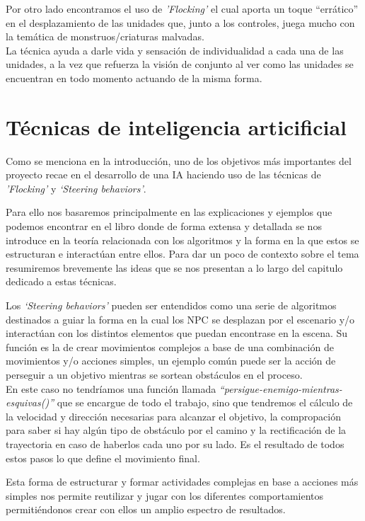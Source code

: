 Por otro lado encontramos el uso de \textit{'Flocking'} el cual aporta un toque ``errático''
en el desplazamiento de las unidades que, junto a los controles, juega mucho con la temática 
de monstruos/criaturas malvadas. \\
La técnica ayuda a darle vida y sensación de individualidad
a cada una de las unidades, a la vez que refuerza la visión de conjunto al ver como las
unidades se encuentran en todo momento actuando de la misma forma. 


\section{Técnicas de inteligencia articificial}
Como se menciona en la introducción, uno de los objetivos más importantes 
del proyecto recae en el desarrollo de una \ac{IA} haciendo uso de las técnicas de 
\textit{'Flocking'} y \textit{`Steering behaviors'}.

Para ello nos basaremos principalmente en las explicaciones y ejemplos que podemos
encontrar en el libro \cite[ch.~3]{Millington2009} donde de forma extensa y detallada
se nos introduce en la teoría relacionada con los algoritmos y la forma en la que estos
se estructuran e interactúan entre ellos. Para dar un poco de contexto sobre el tema
resumiremos brevemente las ideas que se nos presentan a lo largo del capitulo dedicado
a estas técnicas. 

Los \textit{`Steering behaviors'} pueden ser entendidos como una serie de algoritmos
destinados a guiar la forma en la cual los \ac{NPC} se desplazan por el escenario
y/o interactúan con los distintos elementos que puedan encontrase en la escena. Su función
es la de crear movimientos complejos a base de una combinación de movimientos 
y/o acciones simples, un ejemplo común puede ser la acción de perseguir a un objetivo
mientras se sortean obstáculos en el proceso. \\ 
En este caso no tendríamos una función llamada 
\textit{``persigue-enemigo-mientras-esquivas()''} que se encargue de todo el 
trabajo, sino que tendremos el cálculo de la velocidad y dirección necesarias para
alcanzar el objetivo, la compropación para saber si hay algún tipo de
obstáculo por el camino y la rectificación de la trayectoria en caso de
haberlos cada uno por su lado. Es el resultado de todos estos pasos lo que define el
movimiento final.

Esta forma de estructurar y formar actividades complejas en base a acciones más simples
nos permite reutilizar y jugar con los diferentes comportamientos permitiéndonos crear
con ellos un amplio espectro de resultados.


